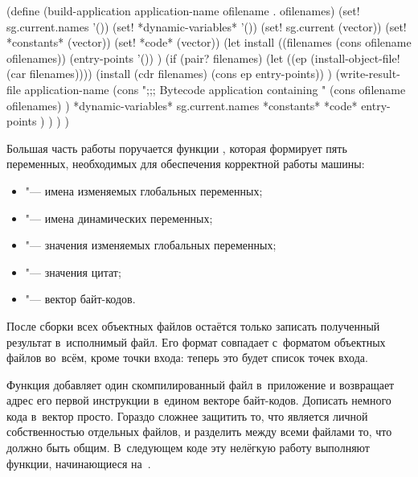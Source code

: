 \begin{code:lisp}
(define (build-application application-name ofilename . ofilenames)
  (set! sg.current.names    '())
  (set! *dynamic-variables* '())
  (set! sg.current          (vector))
  (set! *constants*         (vector))
  (set! *code*              (vector))
  (let install ((filenames (cons ofilename ofilenames))
                (entry-points '()) )
    (if (pair? filenames)
        (let ((ep (install-object-file! (car filenames))))
          (install (cdr filenames) (cons ep entry-points)) )
        (write-result-file application-name
                           (cons ";;; Bytecode application containing "
                                 (cons ofilename ofilenames) )
                           *dynamic-variables*
                           sg.current.names
                           *constants*
                           *code*
                           entry-points ) ) ) )
\end{code:lisp}

Большая часть работы поручается функции , которая
формирует пять переменных, необходимых для обеспечения корректной работы машины:

\begin{itemize}
  \item {} "--- имена изменяемых глобальных переменных;

  \item {} "--- имена динамических переменных;

  \item {} "--- значения изменяемых глобальных переменных;

  \item {} "--- значения цитат;

  \item {} "--- вектор байт-кодов.
\end{itemize}

\noindent
После сборки всех объектных файлов остаётся только записать полученный результат
в~исполнимый файл. Его формат совпадает с~форматом объектных файлов во~всём,
кроме точки входа: теперь это будет список точек входа.

Функция  добавляет один скомпилированный файл
в~приложение и возвращает адрес его первой инструкции в~едином векторе
байт-кодов. Дописать немного кода в~вектор  просто. Гораздо сложнее
защитить то, что является личной собственностью отдельных файлов, и разделить
между всеми файлами то, что должно быть общим. В~следующем коде эту нелёгкую
работу выполняют функции, начинающиеся на~.

